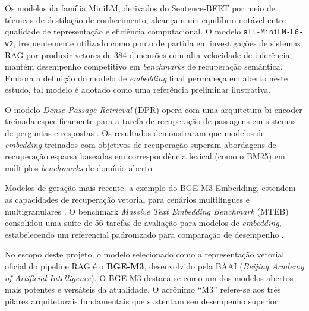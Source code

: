\documentclass[
	12pt,				%
	openright,			%
	oneside,			%
	a4paper,			%
	tccpreliminar,		%
	]{ABNT-DC-UEL}
\begin{document}
Os modelos da família MiniLM, derivados do Sentence-BERT por meio de técnicas de destilação de conhecimento, alcançam um equilíbrio notável entre qualidade de representação e eficiência computacional. O modelo \texttt{all-MiniLM-L6-v2}, frequentemente utilizado como ponto de partida em investigações de sistemas RAG por produzir vetores de 384 dimensões com alta velocidade de inferência, mantém desempenho competitivo em \textit{benchmarks} de recuperação semântica. Embora a definição do modelo de \textit{embedding} final permaneça em aberto neste estudo, tal modelo é adotado como uma referência preliminar ilustrativa.

O modelo \textit{Dense Passage Retrieval} (DPR) opera com uma arquitetura bi-encoder treinada especificamente para a tarefa de recuperação de passagens em sistemas de perguntas e respostas \cite{karpukhin2020dpr}. Os resultados demonstraram que modelos de \textit{embedding} treinados com objetivos de recuperação superam abordagens de recuperação esparsa baseadas em correspondência lexical (como o BM25) em múltiplos \textit{benchmarks} de domínio aberto.

Modelos de geração mais recente, a exemplo do BGE M3-Embedding, estendem as capacidades de recuperação vetorial para cenários multilíngues e multigranulares \cite{bge2024improving}. O benchmark \textit{Massive Text Embedding Benchmark} (MTEB) consolidou uma suíte de 56 tarefas de avaliação para modelos de \textit{embedding}, estabelecendo um referencial padronizado para comparação de desempenho \cite{muennighoff2022mteb}.

No escopo deste projeto, o modelo selecionado como a representação vetorial oficial do pipeline RAG é o \textbf{BGE-M3}, desenvolvido pela BAAI (\textit{Beijing Academy of Artificial Intelligence}). O BGE-M3 destaca-se como um dos modelos abertos mais potentes e versáteis da atualidade. O acrônimo ``M3'' refere-se aos três pilares arquiteturais fundamentais que sustentam seu desempenho superior:
\end{document}
